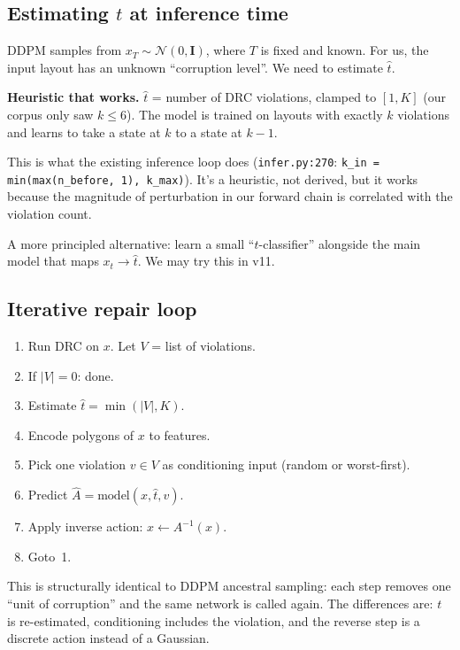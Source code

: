 \documentclass[11pt,a4paper]{article}
\newcommand{\N}{\mathcal{N}}
\begin{document}
\subsection{Estimating $t$ at inference time}

DDPM samples from $x_T \sim \N(0, \mathbf{I})$, where $T$ is fixed and known.
For us, the input layout has an unknown ``corruption level''. We need
to estimate $\hat t$.

\textbf{Heuristic that works.} $\hat t$ = number of DRC violations,
clamped to $[1, K]$ (our corpus only saw $k \leq 6$). The model is
trained on layouts with exactly $k$ violations and learns to take a
state at $k$ to a state at $k-1$.

This is what the existing inference loop does (\texttt{infer.py:270}:
\verb|k_in = min(max(n_before, 1), k_max)|). It's a heuristic, not derived,
but it works because the magnitude of perturbation in our forward chain
is correlated with the violation count.

A more principled alternative: learn a small ``$t$-classifier'' alongside
the main model that maps $x_t \to \hat t$. We may try this in v11.

\subsection{Iterative repair loop}

\begin{tcolorbox}[colback=gray!5,colframe=black,title=\textbf{Diffusion-style repair (analogue of DDPM sampling)}]
\begin{enumerate}[leftmargin=*]
\item Run DRC on $x$. Let $V$ = list of violations.
\item If $|V| = 0$: done.
\item Estimate $\hat t = \min(|V|, K)$.
\item Encode polygons of $x$ to features.
\item Pick one violation $v \in V$ as conditioning input (random or worst-first).
\item Predict $\hat A = \text{model}(x, \hat t, v)$.
\item Apply inverse action: $x \leftarrow A^{-1}(x)$.
\item Goto~1.
\end{enumerate}
\end{tcolorbox}

This is structurally identical to DDPM ancestral sampling: each step
removes one ``unit of corruption'' and the same network is called
again. The differences are: $t$ is re-estimated, conditioning includes
the violation, and the reverse step is a discrete action instead of a
Gaussian.
\end{document}

